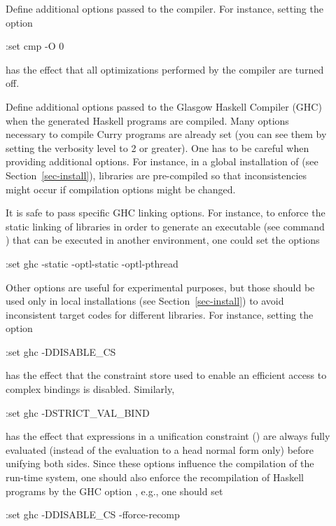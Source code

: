 \begin{description}
\item[]
Define additional options passed to the \CYS compiler.
For instance, setting the option
\begin{curry}
:set cmp -O 0
\end{curry}
has the effect that all optimizations performed by the \CYS compiler
are turned off.

\item[]
Define additional options passed to the Glasgow Haskell Compiler (GHC)
when the generated Haskell programs are compiled.
Many options necessary to compile Curry programs
are already set (you can see them by setting the verbosity
level to 2 or greater).
One has to be careful when providing additional options.
For instance, in a global installation of \CYS
(see Section~\ref{sec-install}), libraries are pre-compiled
so that inconsistencies might occur if compilation options
might be changed.

It is safe to pass specific GHC linking options.
For instance, to enforce the static linking of libraries
in order to generate an executable (see command )
that can be executed in another environment, one could set the
options
\begin{curry}
:set ghc -static -optl-static -optl-pthread
\end{curry}

Other options are useful for experimental purposes,
but those should be used only in local installations
(see Section~\ref{sec-install}) to avoid inconsistent
target codes for different libraries.
For instance, setting the option
\begin{curry}
:set ghc -DDISABLE_CS
\end{curry}
has the effect that the constraint store used to enable
an efficient access to complex bindings is disabled.
Similarly,
\begin{curry}
:set ghc -DSTRICT_VAL_BIND
\end{curry}
has the effect that expressions in a unification constraint
(\code{=:=}) are always fully evaluated
(instead of the evaluation to a head normal form only)
before unifying both sides.
Since these options influence the compilation of the run-time system,
one should also enforce the recompilation of Haskell programs
by the GHC option , e.g., one should set
\begin{curry}
:set ghc -DDISABLE_CS -fforce-recomp
\end{curry}


\end{description}
